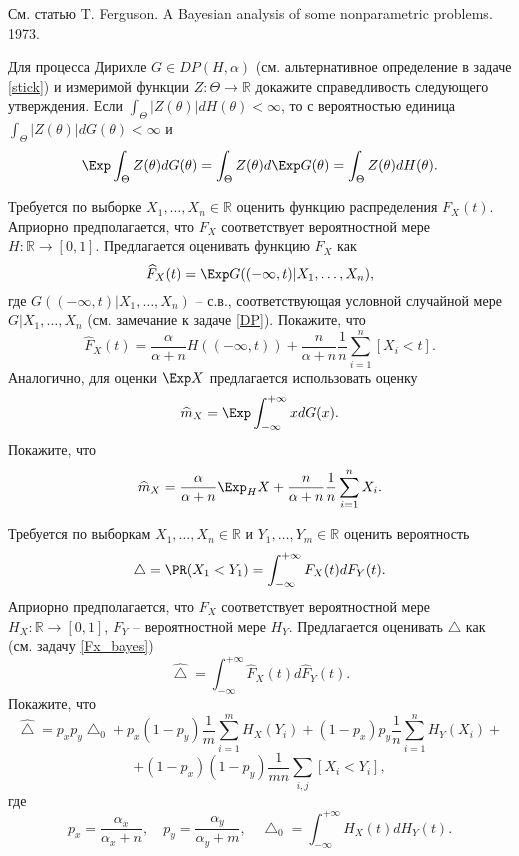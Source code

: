 \begin{ordre}
См. статью T. Ferguson. A Bayesian analysis of some nonparametric problems. 1973. 
\end{ordre}

\begin{problem}
Для процесса Дирихле $G \in DP(H, \alpha)$ (см. альтернативное определение в задаче \ref{stick}) и измеримой функции $Z: \Theta \to \mathbb{R}$ докажите справедливость следующего утверждения. Если $\int_{\Theta} |Z(\theta)| dH (\theta) < \infty$, то с вероятностью единица 
$\int_{\Theta} |Z(\theta)| dG (\theta) < \infty$ и 
\[
\Exp \int_{\Theta} Z(\theta) dG (\theta)  = \int_{\Theta} Z(\theta) d \Exp G (\theta) =  \int_{\Theta} Z(\theta) dH (\theta).
\]
\end{problem}

\begin{problem}
\label{Fx_bayes}
Требуется по выборке $X_1,\ldots,X_n \in \mathbb{R}$ оценить функцию распределения $F_X(t)$. Априорно предполагается, что $F_X$ соответствует вероятностной мере $H: \mathcal{\mathbb{R}} \to [0,1]$. Предлагается оценивать функцию $F_X$ как 
\[
\widehat{F}_X(t) = \Exp G((-\infty, t) | X_1,\ldots,X_n),
\]
где $G((-\infty, t) | X_1,\ldots,X_n)$ -- с.в., соответствующая условной случайной мере $G | X_1,\ldots,X_n$ (см. замечание к задаче \ref{DP}).
Покажите, что
\[
\widehat{F}_X(t) = \frac{\alpha}{\alpha+n} H((-\infty, t)) + \frac{n}{\alpha+n}\frac{1}{n} \sum_{i=1}^{n} [X_i < t].
\]
Аналогично, для оценки $\Exp X$ предлагается использовать оценку
\[
\widehat{m}_X = \Exp \int_{-\infty}^{+\infty} x dG(x).
\]
Покажите, что
\[
\widehat{m}_X = \frac{\alpha}{\alpha+n} \Exp_{H} X + \frac{n}{\alpha+n}\frac{1}{n} \sum_{i=1}^{n} X_i.
\]

\end{problem}


\begin{problem}
Требуется по выборкам $X_1,\ldots,X_n \in \mathbb{R}$ и $Y_1,\ldots,Y_m \in \mathbb{R}$ оценить вероятность
\[
\bigtriangleup = \PR(X_1 < Y_1) = \int_{-\infty}^{+\infty} F_X(t)dF_Y(t).
\]
Априорно предполагается, что $F_X$ соответствует вероятностной мере $H_X: \mathcal{\mathbb{R}} \to [0,1]$, $F_Y$ -- вероятностной мере $H_Y$. Предлагается оценивать $\bigtriangleup$ как (см. задачу \ref{Fx_bayes}) 
\[
\widehat{\bigtriangleup} = \int_{-\infty}^{+\infty} \widehat{F}_X(t)d\widehat{F}_Y(t).
\]
Покажите, что
\[
\widehat{\bigtriangleup} = p_x p_y \bigtriangleup_0 + p_x(1-p_y)\frac{1}{m} \sum_{i=1}^m H_X(Y_i) + (1-p_x)p_y\frac{1}{n} \sum_{i=1}^n H_Y(X_i) + 
\]
\[
+(1-p_x)(1-p_y) \frac{1}{m n} \sum_{i,j} [X_i < Y_i],
\]
где
\[
p_x = \frac{\alpha_x}{\alpha_x+n},
\quad
p_y = \frac{\alpha_y}{\alpha_y+m},
\quad
\bigtriangleup_0 = \int_{-\infty}^{+\infty} H_X(t)dH_Y(t).
\]
\end{problem}

